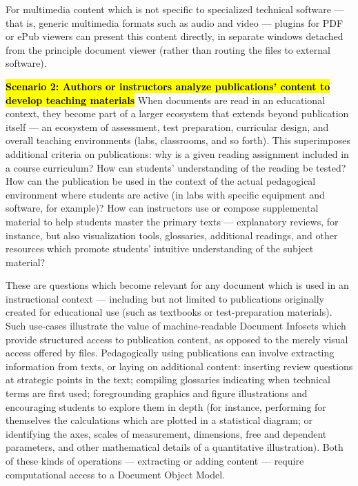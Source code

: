 \documentclass[10pt,letterpaper]{article}
\newcommand{\pseudoIndent}{

\vspace{10pt}\hspace*{38pt}}
\newcommand{\LPF}{\resizebox{!}{8pt}{\AcronymText{LPF}}}
\newcommand{\textscc}[1]{{\color{orr!35!black}{{%
						\fontfamily{Cabin-TLF}\fontseries{b}\selectfont{\textsc{\scriptsize{#1}}}}}}}
\newcommand{\AcronymText}[1]{{\textscc{#1}}}
\newcommand{\PDF}{\resizebox{!}{8pt}{\AcronymText{PDF}}}
\newenvironment{mldescription}{%
  \begin{addmargin}[4pt]{1em}
    \setlength{\parindent}{-1em}%
    \newcommand*{\mlitem}[1][]{\vspace{20pt}\par\medskip%
\hl{\textbf{##1}}\quad}\indent
}{%
  \end{addmargin}
  \medskip
}
\begin{document}
{{{\begin{mldescription}
\pseudoIndent{} For multimedia content which is 
not specific to specialized technical software 
--- that is, generic multimedia formats such as 
audio and video --- 
\LPF{} plugins for PDF or ePub viewers can present 
this content directly, in separate windows detached 
from the principle document viewer (rather than 
routing the files to external software).   

\mlitem[Scenario 2: Authors or instructors 
analyze publications' content to develop teaching 
materials]  When documents are read in an 
educational context, they become part of a 
larger ecosystem that extends beyond publication 
itself --- an ecosystem of assessment, test preparation, 
curricular design, and overall teaching environments 
(labs, classrooms, and so forth).  This superimposes 
additional criteria on publications: why is a given 
reading assignment included in a course curriculum?  
How can students' understanding of the reading be 
tested?  How can the publication be used in the 
context of the actual pedagogical environment where 
students are active (in labs with specific 
equipment and software, for example)?  How can 
instructors use or compose supplemental material to 
help students master the primary texts 
--- explanatory reviews, for instance, but also 
visualization tools, glossaries, additional readings, 
and other resources which promote students' intuitive 
understanding of the subject material?    

\pseudoIndent{} These are questions which become 
relevant for any document which is used in an 
instructional context --- including but not limited 
to publications originally created for 
educational use (such as textbooks or test-preparation 
materials).  Such use-cases illustrate the value of 
machine-readable Document Infosets which provide 
structured access to publication content, as opposed 
to the merely visual access offered by \PDF{} files.  
Pedagogically using publications can involve extracting 
information from texts, or laying on additional 
content: inserting review questions at strategic 
points in the text; compiling glossaries indicating 
when technical terms are first used; foregrounding 
graphics and figure illustrations and encouraging 
students to explore them in depth 
(for instance, performing for themselves the calculations 
which are plotted in a statistical diagram; or 
identifying the axes, scales of measurement, dimensions, 
free and dependent parameters, and other mathematical 
details of a quantitative illustration).  Both of 
these kinds of operations --- extracting or adding 
content --- require computational access to a 
Document Object Model.    
 

\end{mldescription}}}}
\end{document}
